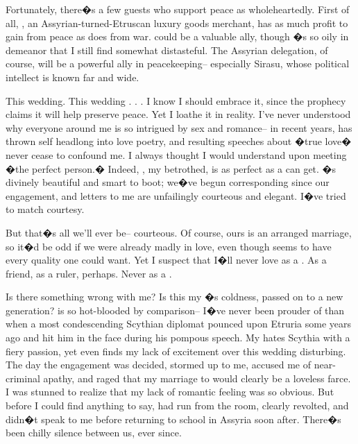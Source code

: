 \documentclass[char]{Kos}
\begin{document}
Fortunately, there�s a few guests who support peace as wholeheartedly. First of all, \cMerchant{\name}, an Assyrian-turned-Etruscan luxury goods merchant, has as much profit to gain from peace as \cArmsDealer{\nickname} does from war. \cMerchant{\nickname} could be a valuable ally, though \cMerchant{\they}�s so oily in \cMerchant{\their} demeanor that I still find \cMerchant{\them} somewhat distasteful. The Assyrian delegation, of course, will be a powerful ally in peacekeeping-- especially Sirasu, whose political intellect is known far and wide.

This wedding. This wedding . . . I know I should embrace it, since the prophecy claims it will help preserve peace. Yet I loathe it in reality. I've never understood why everyone around me is so intrigued by sex and romance-- in recent years, \cPoet{\nickname} has thrown \cPoet{\them}self headlong into love poetry, and \cPoet{\their} resulting speeches about �true love� never cease to confound me. I always thought I would understand upon meeting �the perfect person.� Indeed, \cBride{\nickname}, my betrothed, is as perfect as a \cBride{\human} can get. \cBride{\They}�s divinely beautiful and smart to boot; we�ve begun corresponding since our engagement, and \cBride{\their} letters to me are unfailingly courteous and elegant. I�ve tried to match \cBride{\their} courtesy. 

But that�s all we'll ever be-- courteous. Of course, ours is an arranged marriage, so it�d be odd if we were already madly in love, even though \cBride{\they} seems to have every quality one could want. Yet I suspect that I�ll never love \cBride{\them} as a \cBride{\spouse}. As a friend, as a ruler, perhaps. Never as a \cBride{\spouse}.

Is there something wrong with me? Is this my \cEtruriaKing{\parent}�s coldness, passed on to a new generation? \cPoet{\nickname} is so hot-blooded by comparison-- I�ve never been prouder of \cPoet{\them} than when a most condescending Scythian diplomat pounced upon Etruria some years ago and \cPoet{\they} hit him in the face during his pompous speech. My \cPoet{\sibling} hates Scythia with a fiery passion, yet even \cPoet{\they} finds my lack of excitement over this wedding disturbing. The day the engagement was decided, \cPoet{\they} stormed up to me, accused me of near-criminal apathy, and raged that my marriage to \cBride{\nickname} would clearly be a loveless farce. I was stunned to realize that my lack of romantic feeling was so obvious. But before I could find anything to say, \cPoet{\nickname} had run from the room, clearly revolted, and \cPoet{\they} didn�t speak to me before returning to school in Assyria soon after. There�s been chilly silence between us, ever since.
\end{document}
